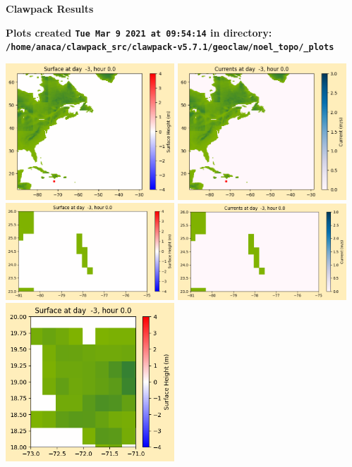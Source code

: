 \documentclass[11pt]{article}
\begin{document}
        \begin{center}{\Large\bf Clawpack Results}\vskip 5pt
        
        \bf Plots created {\tt Tue Mar  9 2021 at 09:54:14} in directory: \vskip 5pt
        \verb+/home/anaca/clawpack_src/clawpack-v5.7.1/geoclaw/noel_topo/_plots+
        \end{center}
        \vskip 5pt
        \includegraphics[width=0.475\textwidth]{frame0000fig1001.png}
\includegraphics[width=0.475\textwidth]{frame0000fig1002.png}
\vskip 10pt 
\includegraphics[width=0.475\textwidth]{frame0000fig1003.png}
\includegraphics[width=0.475\textwidth]{frame0000fig1004.png}
\vskip 10pt 
\includegraphics[width=0.475\textwidth]{frame0000fig1005.png}
\end{document}

